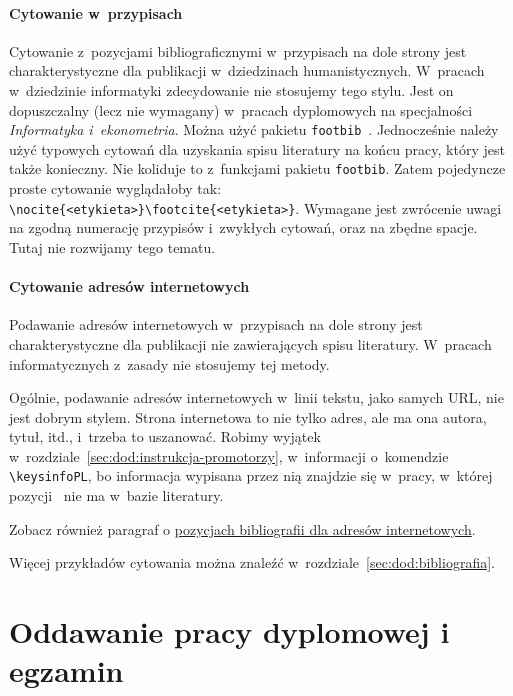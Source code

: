 \paragraph{Cytowanie w~przypisach}
\label{sec:dod:cytowanie-przypisy}
Cytowanie z~pozycjami bibliograficznymi w~przypisach na dole strony jest charakterystyczne dla publikacji w~dziedzinach humanistycznych. W~pracach w~dziedzinie informatyki zdecydowanie nie stosujemy tego stylu. Jest on dopuszczalny (lecz nie wymagany) w~pracach dyplomowych na specjalności {\em Informatyka i~ekonometria}. Można użyć pakietu {\tt footbib}~. Jednocześnie należy użyć typowych cytowań dla uzyskania spisu literatury na końcu pracy, który jest także konieczny. Nie koliduje to z~funkcjami pakietu {\tt footbib}. Zatem pojedyncze proste cytowanie wyglądałoby tak: \verb+\nocite{<etykieta>}\footcite{<etykieta>}+. Wymagane jest zwrócenie uwagi na zgodną numerację przypisów i~zwykłych cytowań, oraz na zbędne spacje. Tutaj nie rozwijamy tego tematu.


\paragraph{Cytowanie adresów internetowych}
\label{sec:dod:cytowanie-url}
Podawanie adresów internetowych w~przypisach na dole strony jest charakterystyczne dla publikacji nie zawierających spisu literatury. W~pracach informatycznych z~zasady nie stosujemy tej metody.

Ogólnie, podawanie adresów internetowych w~linii tekstu, jako samych URL, nie jest dobrym stylem. Strona internetowa to nie tylko adres, ale ma ona autora, tytuł, itd., i~trzeba to uszanować. Robimy wyjątek w~rozdziale~\ref{sec:dod:instrukcja-promotorzy}, w~informacji o~komendzie \verb+\keysinfoPL+, bo informacja wypisana przez nią znajdzie się w~pracy, w~której pozycji~ nie ma w~bazie literatury.

Zobacz również paragraf o \hyperref[sec:dod:bibliografia-url]{pozycjach bibliografii dla adresów internetowych}.

\vspace{2\parsep}

Więcej przykładów cytowania można znaleźć w~rozdziale~\ref{sec:dod:bibliografia}.


\newpage

\section{Oddawanie pracy dyplomowej i egzamin}
\label{sec:dod:dyplom-egzamin}

